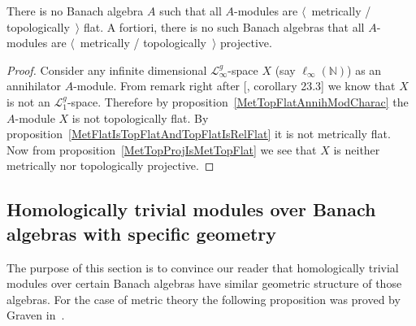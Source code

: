 \begin{proposition} There is no Banach algebra $A$ such that all $A$-modules are
$\langle$~metrically / topologically~$\rangle$ flat. A fortiori, there is no
such Banach algebras that all $A$-modules are $\langle$~metrically /
topologically~$\rangle$ projective.
\end{proposition}
\begin{proof} Consider any infinite dimensional $\mathscr{L}_\infty^g$-space $X$
(say $\ell_\infty(\mathbb{N})$) as an annihilator $A$-module. From remark right
after [\cite{DefFloTensNorOpId}, corollary 23.3] we know that $X$ is not an
$\mathscr{L}_1^g$-space. Therefore by proposition~\ref{MetTopFlatAnnihModCharac}
the $A$-module $X$ is not topologically flat. By
proposition~\ref{MetFlatIsTopFlatAndTopFlatIsRelFlat} it is not metrically flat.
Now from proposition~\ref{MetTopProjIsMetTopFlat} we see that $X$ is neither
metrically nor topologically projective.
\end{proof}


\subsection{
    Homologically trivial modules over Banach algebras with specific geometry
}\label{
    SubSectionHomologicallyTrivialModulesOverBanachAlgebrasWithSpecificGeometry
}

The purpose of this section is to convince our reader that homologically trivial
modules over certain Banach algebras have similar geometric structure of those
algebras. For the case of metric theory the following proposition was proved by
Graven in~\cite{GravInjProjBanMod}.

